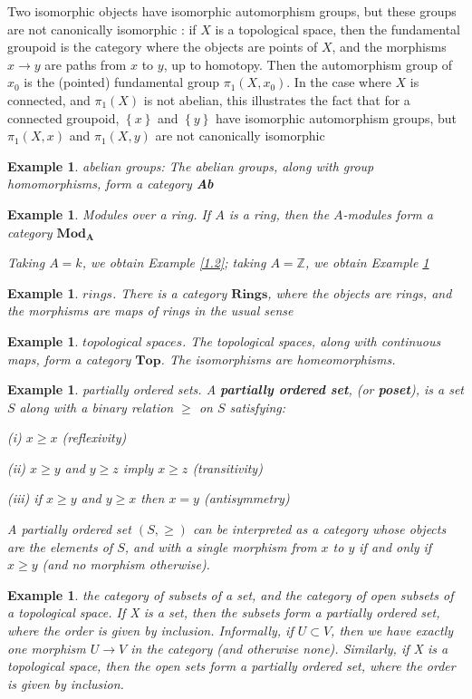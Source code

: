 \documentclass{article}
\newtheorem{example}[theorem]{Example}
\begin{document}
Two isomorphic objects have isomorphic automorphism groups, but these groups are not canonically isomorphic : if $X$ is a topological space, then the fundamental groupoid is the category where the objects are points of $X$, and the morphisms $x \rightarrow y$ are paths from $x$ to $y$, up to homotopy. Then the automorphism group of $x_0$ is the (pointed) fundamental group $\pi_1(X, x_0)$. In the case where $X$ is connected, and $\pi_1(X)$ is not abelian, this illustrates the fact that for a connected groupoid, $\left\{x\right\}$ and $\left\{y\right\}$ have isomorphic automorphism groups, but $\pi_1(X,x)$ and $\pi_1(X,y)$ are not canonically isomorphic
\begin{example}
abelian groups: The abelian groups, along with group homomorphisms, form a category \textbf{Ab}
\label{1.4}
\end{example}
\begin{example}
Modules over a ring. If $A$ is a ring, then the $A$-modules form a category $\boldsymbol{Mod_A}$

Taking $A = k$, we obtain Example \ref{1.2}; taking $A =\mathbb Z$, we obtain Example \ref{1.4}
\end{example}
\begin{example}
$rings$. There is a category $\boldsymbol{Rings}$, where the objects are rings, and the morphisms are maps of rings in the usual sense
\end{example}
\begin{example}
$topological\; spaces$. The topological spaces, along with continuous maps, form a category $\boldsymbol{Top}$. The isomorphisms are homeomorphisms.
\end{example}
\begin{example}
partially ordered sets. A \textbf{partially ordered set}, (or \textbf{poset}), is a set $S$ along with a binary relation $\geq$ on $S$ satisfying:

(i) $x \geq x$ (reflexivity)

(ii) $x \geq y$ and $y \geq z$ imply $x \geq z$ (transitivity)

(iii) if $x \geq y$ and $y \geq x$ then $x = y$ (antisymmetry)

A partially ordered set $(S, \geq)$ can be interpreted as a category whose objects are the elements of $S$, and with a single morphism from $x$ to $y$ if and only if $x \geq y$ (and no morphism otherwise).
\end{example}
\begin{example}
the category of subsets of a set, and the category of open subsets of a topological space. If X is a set, then the subsets form a partially ordered set, where the order is given by inclusion. Informally, if $U \subset V$, then we have exactly one morphism $U \rightarrow V$ in the category (and otherwise none). Similarly, if X is a topological space, then the open sets form a partially ordered set, where the order is given by inclusion.
\end{example}
\end{document}
